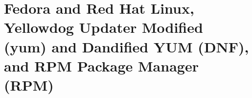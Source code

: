 
\chapter{Fedora and Red Hat Linux, Yellowdog Updater Modified (yum) and Dandified YUM (DNF), and RPM Package Manager (RPM)}

